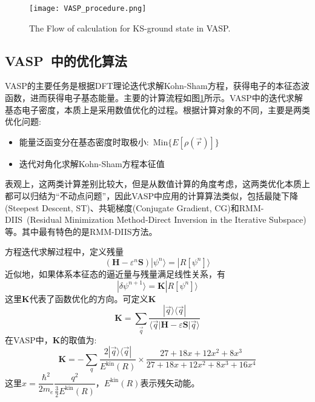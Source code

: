\begin{figure}[h!]
\centering
\texttt{[image: VASP\_procedure.png]}
\caption{\small \textrm{The Flow of calculation for KS-ground state in VASP.}}%
\label{PAW_procedure}
\end{figure}

\subsection{VASP~中的优化算法}
\textrm{VASP}的主要任务是根据\textrm{DFT}理论迭代求解\textrm{Kohn-Sham}方程，获得电子的本征态波函数，进而获得电子基态能量。主要的计算流程如图\ref{PAW_procedure}所示。\textrm{VASP}中的迭代求解基态电子密度，本质上是采用数值优化的过程。根据计算对象的不同，主要是两类优化问题:
\begin{itemize}
	\item 能量泛函变分在基态密度时取极小:~$\mathrm{Min}\{E[\rho(\vec r)]\}$
	\item 迭代对角化求解\textrm{Kohn-Sham}方程本征值
\end{itemize}
表观上，这两类计算差别比较大，但是从数值计算的角度考虑，这两类优化本质上都可以归结为“不动点问题”，因此\textrm{VASP}中应用的计算算法类似，包括最陡下降\textrm{(Steepest Descent, ST)}、共轭梯度\textrm{(Conjugate Gradient, CG)}和\textrm{RMM-DIIS~(Residual Minimization Method-Direct Inversion in the Iterative Subspace)}等。其中最有特色的是\textrm{RMM-DIIS}方法。

方程迭代求解过程中，定义残量
	\begin{displaymath}
		(\mathbf{H}-\varepsilon^n\mathbf{S})|\psi^n\rangle=|R[\psi^n]\rangle
	\end{displaymath}
近似地，如果体系本征态的逼近量与残量满足线性关系，有
\begin{displaymath}
	|\delta\psi^{n+1}\rangle=\mathbf{K}|R[\psi^n]\rangle
\end{displaymath}
这里$\mathbf{K}$代表了函数优化的方向。可定义$\mathbf{K}$
\begin{equation}
	\mathbf{K}=\sum_{\vec q}\dfrac{|\vec q\rangle\langle\vec q|}{\langle\vec q|\mathbf{H}-\varepsilon\mathbf{S}|\vec q\rangle}
	\label{eq:Predict}
\end{equation}
在\textrm{VASP}中，$\mathbf{K}$的取值为:
\begin{displaymath}
	\mathbf{K}=-\sum_q\dfrac{2|\vec q\rangle\langle\vec q|}{E^{\mathrm{kin}}(R)}\times\dfrac{27+18x+12x^2+8x^3}{27+18x+12x^2+8x^3+16x^4}
\end{displaymath}
这里$x=\dfrac{\hbar^2}{2m_e}\dfrac{q^2}{\frac32E^{\mathrm{kin}}(R)}$，$E^{\mathrm{kin}}(R)$表示残矢动能。

